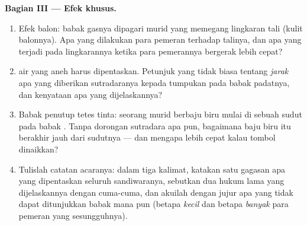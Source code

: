 \begin{problem}
\medskip\noindent\textbf{Bagian III --- Efek khusus.}
\begin{enumerate}[resume]
  \item Efek balon: babak gasnya dipagari murid yang memegang
        lingkaran tali (kulit balonnya). Apa yang dilakukan para
        pemeran  terhadap talinya, dan apa yang terjadi pada
        lingkarannya ketika para pemerannya bergerak lebih cepat?
  \item {} air yang aneh harus dipentaskan. Petunjuk yang
        tidak biasa tentang \emph{jarak} apa yang diberikan
        sutradaranya kepada tumpukan pada babak padatnya, dan
        kenyataan  apa yang dijelaskannya?
  \item Babak penutup tetes tinta: seorang murid berbaju biru mulai
        di sebuah sudut pada babak \emph{}. Tanpa dorongan
        sutradara apa pun, bagaimana baju biru itu berakhir jauh dari
        sudutnya --- dan mengapa lebih cepat kalau tombol 
        dinaikkan?
  \item Tulislah catatan acaranya: dalam tiga kalimat, katakan satu
        gagasan apa yang dipentaskan seluruh sandiwaranya, sebutkan
        dua hukum lama yang dijelaskannya dengan cuma-cuma, dan
        akuilah dengan jujur apa yang tidak dapat ditunjukkan babak
        mana pun (betapa \emph{kecil} dan betapa \emph{banyak} para
        pemeran yang sesungguhnya).
\end{enumerate}
\end{problem}
